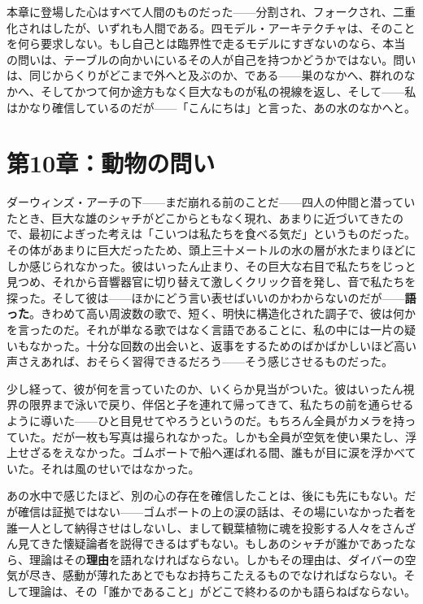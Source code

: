 \documentclass[11pt, twoside, openright]{book}
\begin{document}
本章に登場した心はすべて人間のものだった------分割され、フォークされ、二重化されはしたが、いずれも人間である。四モデル・アーキテクチャは、そのことを何ら要求しない。もし自己とは臨界性で走るモデルにすぎないのなら、本当の問いは、テーブルの向かいにいるその人が自己を持つかどうかではない。問いは、同じからくりがどこまで外へと及ぶのか、である------巣のなかへ、群れのなかへ、そしてかつて何か途方もなく巨大なものが私の視線を返し、そして------私はかなり確信しているのだが------「こんにちは」と言った、あの水のなかへと。


\chapter*{第10章：動物の問い}

ダーウィンズ・アーチの下------まだ崩れる前のことだ------四人の仲間と潜っていたとき、巨大な雄のシャチがどこからともなく現れ、あまりに近づいてきたので、最初によぎった考えは「こいつは私たちを食べる気だ」というものだった。その体があまりに巨大だったため、頭上三十メートルの水の層が水たまりほどにしか感じられなかった。彼はいったん止まり、その巨大な右目で私たちをじっと見つめ、それから音響器官に切り替えて激しくクリック音を発し、音で私たちを探った。そして彼は------ほかにどう言い表せばいいのかわからないのだが------\textbf{語った}。きわめて高い周波数の歌で、短く、明快に構造化された調子で、彼は何かを言ったのだ。それが単なる歌ではなく言語であることに、私の中には一片の疑いもなかった。十分な回数の出会いと、返事をするためのばかばかしいほど高い声さえあれば、おそらく習得できるだろう------そう感じさせるものだった。

少し経って、彼が何を言っていたのか、いくらか見当がついた。彼はいったん視界の限界まで泳いで戻り、伴侶と子を連れて帰ってきて、私たちの前を通らせるように導いた------ひと目見せてやろうというのだ。もちろん全員がカメラを持っていた。だが一枚も写真は撮られなかった。しかも全員が空気を使い果たし、浮上せざるをえなかった。ゴムボートで船へ運ばれる間、誰もが目に涙を浮かべていた。それは風のせいではなかった。

あの水中で感じたほど、別の心の存在を確信したことは、後にも先にもない。だが確信は証拠ではない------ゴムボートの上の涙の話は、その場にいなかった者を誰一人として納得させはしないし、まして観葉植物に魂を投影する人々をさんざん見てきた懐疑論者を説得できるはずもない。もしあのシャチが誰かであったなら、理論はその\textbf{理由}を語れなければならない。しかもその理由は、ダイバーの空気が尽き、感動が薄れたあとでもなお持ちこたえるものでなければならない。そして理論は、その「誰かであること」がどこで終わるのかも語らねばならない。
\end{document}
